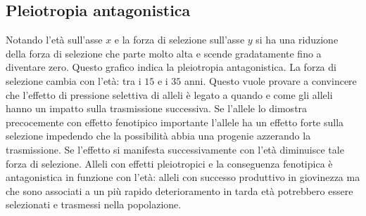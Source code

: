 \subsection{Pleiotropia antagonistica}
Notando l'et\`a sull'asse $x$ e la forza di selezione sull'asse $y$ si ha una riduzione della forza di selezione che parte molto alta e scende gradatamente fino a diventare zero. 
Questo grafico indica la pleiotropia antagonistica. La forza di selezione cambia con l'et\`a: tra i $15$ e i $35$ anni. Questo vuole provare a convincere che l'effetto di pressione 
selettiva di alleli \`e legato a quando e come gli alleli hanno un impatto sulla trasmissione successiva. Se l'allele lo dimostra precocemente con effetto fenotipico importante 
l'allele ha un effetto forte sulla selezione impedendo che la possibilit\`a abbia una progenie azzerando la trasmissione. Se l'effetto si manifesta successivamente con l'et\`a diminuisce
tale forza di selezione. Alleli con effetti pleiotropici e la conseguenza fenotipica \`e antagonistica in funzione con l'et\`a: alleli con successo produttivo in giovinezza ma che 
sono associati a un pi\`u rapido deterioramento in tarda et\`a potrebbero essere selezionati e trasmessi nella popolazione. 
